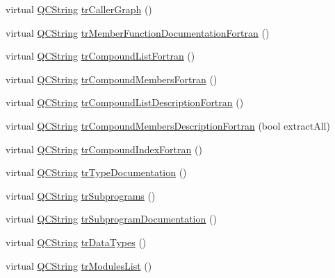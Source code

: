 \begin{DoxyCompactItemize}
\item 
virtual \mbox{\hyperlink{class_q_c_string}{Q\+C\+String}} \mbox{\hyperlink{class_translator_chinesetraditional_aaacafeecebb203594afc68e25cc8ce02}{tr\+Caller\+Graph}} ()
\item 
virtual \mbox{\hyperlink{class_q_c_string}{Q\+C\+String}} \mbox{\hyperlink{class_translator_chinesetraditional_a8cefb650274dea8420f41b59f3fd4410}{tr\+Member\+Function\+Documentation\+Fortran}} ()
\item 
virtual \mbox{\hyperlink{class_q_c_string}{Q\+C\+String}} \mbox{\hyperlink{class_translator_chinesetraditional_a99bee7a174f4065eddc040aa6a83cdcd}{tr\+Compound\+List\+Fortran}} ()
\item 
virtual \mbox{\hyperlink{class_q_c_string}{Q\+C\+String}} \mbox{\hyperlink{class_translator_chinesetraditional_a8ee7e0f388ea12d59b3759558f796513}{tr\+Compound\+Members\+Fortran}} ()
\item 
virtual \mbox{\hyperlink{class_q_c_string}{Q\+C\+String}} \mbox{\hyperlink{class_translator_chinesetraditional_a4189f4826592b973a95a57d271eb4f5b}{tr\+Compound\+List\+Description\+Fortran}} ()
\item 
virtual \mbox{\hyperlink{class_q_c_string}{Q\+C\+String}} \mbox{\hyperlink{class_translator_chinesetraditional_a94e67a603f3cc7363b43c2a59fb2c768}{tr\+Compound\+Members\+Description\+Fortran}} (bool extract\+All)
\item 
virtual \mbox{\hyperlink{class_q_c_string}{Q\+C\+String}} \mbox{\hyperlink{class_translator_chinesetraditional_ab2091400b7f82668c9a865415554f078}{tr\+Compound\+Index\+Fortran}} ()
\item 
virtual \mbox{\hyperlink{class_q_c_string}{Q\+C\+String}} \mbox{\hyperlink{class_translator_chinesetraditional_aadf1f95dcc6f412dba64f55769148294}{tr\+Type\+Documentation}} ()
\item 
virtual \mbox{\hyperlink{class_q_c_string}{Q\+C\+String}} \mbox{\hyperlink{class_translator_chinesetraditional_a2a39bf72af7b4051d6e4c22138eb2bb2}{tr\+Subprograms}} ()
\item 
virtual \mbox{\hyperlink{class_q_c_string}{Q\+C\+String}} \mbox{\hyperlink{class_translator_chinesetraditional_ab08b94b628f2e02f09e3a02d4b8f85ae}{tr\+Subprogram\+Documentation}} ()
\item 
virtual \mbox{\hyperlink{class_q_c_string}{Q\+C\+String}} \mbox{\hyperlink{class_translator_chinesetraditional_a9b06a74c7f0ac92241fa1ab21ea9115e}{tr\+Data\+Types}} ()
\item 
virtual \mbox{\hyperlink{class_q_c_string}{Q\+C\+String}} \mbox{\hyperlink{class_translator_chinesetraditional_a0ea6d46cf9909297807b95398e087dfb}{tr\+Modules\+List}} ()

\end{DoxyCompactItemize}
